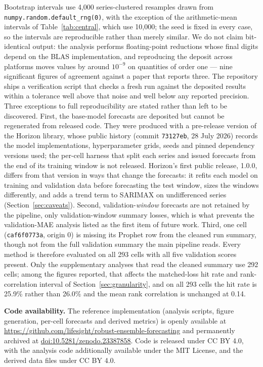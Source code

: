 \documentclass[11pt]{article}
\begin{document}
Bootstrap intervals use 4,000 series-clustered resamples drawn from \texttt{numpy.random.default\_rng(0)}, with the exception of the arithmetic-mean intervals of Table~\ref{tab:central}, which use 10,000; the seed is fixed in every case, so the intervals are reproducible rather than merely similar. We do not claim bit-identical output: the analysis performs floating-point reductions whose final digits depend on the BLAS implementation, and reproducing the deposit across platforms moves values by around $10^{-9}$ on quantities of order one --- nine significant figures of agreement against a paper that reports three. The repository ships a verification script that checks a fresh run against the deposited results within a tolerance well above that noise and well below any reported precision. Three exceptions to full reproducibility are stated rather than left to be discovered. First, the base-model forecasts are deposited but cannot be regenerated from released code. They were produced with a pre-release version of the Horizon library, whose public history (commit \texttt{73127eb}, 28 July 2026) records the model implementations, hyperparameter grids, seeds and pinned dependency versions used; the per-cell harness that split each series and issued forecasts from the end of its training window is not released. Horizon's first public release, 1.0.0, differs from that version in ways that change the forecasts: it refits each model on training and validation data before forecasting the test window, sizes the windows differently, and adds a trend term to SARIMAX on undifferenced series (Section~\ref{sec:caveats}). Second, validation-\emph{window} forecasts are not retained by the pipeline, only validation-window summary losses, which is what prevents the validation-MAE analysis listed as the first item of future work. Third, one cell (\texttt{caf6f0773a}, origin 0) is missing its Prophet row from the cleaned run summary, though not from the full validation summary the main pipeline reads. Every method is therefore evaluated on all 293 cells with all five validation scores present. Only the supplementary analyses that read the cleaned summary use 292 cells; among the figures reported, that affects the matched-loss hit rate and rank-correlation interval of Section~\ref{sec:granularity}, and on all 293 cells the hit rate is 25.9\% rather than 26.0\% and the mean rank correlation is unchanged at 0.14.

\textbf{Code availability.} The reference implementation (analysis scripts, figure generation, per-cell forecasts and derived metrics) is openly available at \url{https://github.com/lifesight/robust-ensemble-forecasting} and permanently archived at \href{https://doi.org/10.5281/zenodo.23387858}{doi:10.5281/zenodo.23387858}. Code is released under CC BY 4.0, with the analysis code additionally available under the MIT License, and the derived data files under CC BY 4.0.
\end{document}
